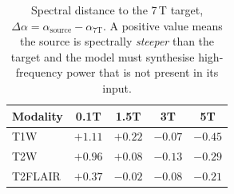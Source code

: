 \begin{table}[H]
  \centering
  \small
  \caption{Spectral distance to the 7\,T target, $\Delta\alpha = \alpha_{\text{source}} - \alpha_{7\text{T}}$. A positive value means the source is spectrally \emph{steeper} than the target and the model must synthesise high-frequency power that is not present in its input.}
  \label{tab:delta-alpha-val}
  \begin{tabular}{lcccc}
    \toprule
    Modality & 0.1T & 1.5T & 3T & 5T \\
    \midrule
    T1W & $+1.11$ & $+0.22$ & $-0.07$ & $-0.45$ \\
    T2W & $+0.96$ & $+0.08$ & $-0.13$ & $-0.29$ \\
    T2FLAIR & $+0.37$ & $-0.02$ & $-0.08$ & $-0.21$ \\
    \bottomrule
  \end{tabular}
\end{table}
